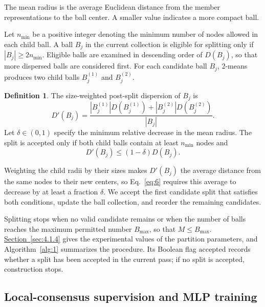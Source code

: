 \documentclass[10pt,letterpaper,nopreprintline]{elsarticle}
\theoremstyle{definition}
\newtheorem{definition}{Definition}
\theoremstyle{plain}
\begin{document}
The mean radius is the average Euclidean distance from the member representations to the ball center. A smaller value indicates a more compact ball.

\Needspace{64pt}

Let \(n_{\min}\) be a positive integer denoting the minimum number of nodes allowed in each child ball. A ball \(B_j\) in the current collection is eligible for splitting only if \(|B_j|\geq 2n_{\min}\). Eligible balls are examined in descending order of \(D(B_j)\), so that more dispersed balls are considered first. For each candidate ball \(B_j\), 2-means produces two child balls \(B_j^{(1)}\) and \(B_j^{(2)}\).

\begin{definition}
The size-weighted post-split dispersion of \(B_j\) is
\begin{equation}\label{eq:5}
D'(B_j) = \frac{|B_j^{(1)}|D(B_j^{(1)}) + |B_j^{(2)}|D(B_j^{(2)})}{|B_j|}.
\end{equation}
Let \(\delta \in (0,1)\) specify the minimum relative decrease in the mean radius. The split is accepted only if both child balls contain at least \(n_{\min}\) nodes and
\begin{equation}\label{eq:6}
D'(B_j) \leq (1 - \delta)D(B_j).
\end{equation}
\end{definition}

Weighting the child radii by their sizes makes \(D'(B_j)\) the average distance from the same nodes to their new centers, so Eq.~\eqref{eq:6} requires this average to decrease by at least a fraction \(\delta\). We accept the first candidate split that satisfies both conditions, update the ball collection, and reorder the remaining candidates.

Splitting stops when no valid candidate remains or when the number of balls reaches the maximum permitted number \(B_{\max}\), so that \(M\leq B_{\max}\). \hyperref[sec:4.1.4]{Section~\ref*{sec:4.1.4}} gives the experimental values of the partition parameters, and Algorithm~\ref{alg:1} summarizes the procedure. Its Boolean flag \(\mathrm{accepted}\) records whether a split has been accepted in the current pass; if no split is accepted, construction stops.



\subsection{Local-consensus supervision and MLP training}\label{sec:3.3}
\end{document}
